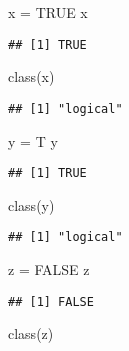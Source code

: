 \documentclass[
]{book}
\newenvironment{Shaded}{\begin{snugshade}}{\end{snugshade}}
\newcommand{\ConstantTok}[1]{\textcolor[rgb]{0.00,0.00,0.00}{#1}}
\newcommand{\FunctionTok}[1]{\textcolor[rgb]{0.00,0.00,0.00}{#1}}
\newcommand{\NormalTok}[1]{#1}
\newcommand{\OtherTok}[1]{\textcolor[rgb]{0.56,0.35,0.01}{#1}}
\begin{document}
\begin{Shaded}
\begin{Highlighting}[]
\NormalTok{x }\OtherTok{=} \ConstantTok{TRUE}
\NormalTok{x}
\end{Highlighting}
\end{Shaded}

\begin{verbatim}
## [1] TRUE
\end{verbatim}

\begin{Shaded}
\begin{Highlighting}[]
\FunctionTok{class}\NormalTok{(x)}
\end{Highlighting}
\end{Shaded}

\begin{verbatim}
## [1] "logical"
\end{verbatim}

\begin{Shaded}
\begin{Highlighting}[]
\NormalTok{y }\OtherTok{=}\NormalTok{ T}
\NormalTok{y}
\end{Highlighting}
\end{Shaded}

\begin{verbatim}
## [1] TRUE
\end{verbatim}

\begin{Shaded}
\begin{Highlighting}[]
\FunctionTok{class}\NormalTok{(y)}
\end{Highlighting}
\end{Shaded}

\begin{verbatim}
## [1] "logical"
\end{verbatim}

\begin{Shaded}
\begin{Highlighting}[]
\NormalTok{z }\OtherTok{=} \ConstantTok{FALSE}
\NormalTok{z}
\end{Highlighting}
\end{Shaded}

\begin{verbatim}
## [1] FALSE
\end{verbatim}

\begin{Shaded}
\begin{Highlighting}[]
\FunctionTok{class}\NormalTok{(z)}
\end{Highlighting}
\end{Shaded}
\end{document}
